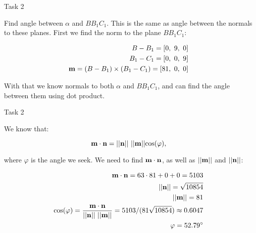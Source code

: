 \documentclass{beamer}
\begin{document}
\begin{frame}{Task 2}
	\begin{flushleft}
		
		Find angle between $\alpha$ and $B B_1 C_1$. This is the same as angle between the normals to these planes. First we find the norm to the plane $B B_1 C_1$:
		
		
\begin{align}
	B - B_1 = [0, \ 9,  \ 0] \\
	B_1 - C_1 = [0, \ 0,  \ 9]  \\
	\mathbf{m} = (B - B_1) \times (B_1 - C_1) = [81, \ 0,  \ 0]
\end{align}		
		
		With that we know normals to both $\alpha$ and $B B_1 C_1$, and can find the angle between them using dot product.
		
	\end{flushleft}
\end{frame}


\begin{frame}{Task 2}
	\begin{flushleft}
		
		We know that:
		
		\begin{equation}
			\mathbf{m} \cdot \mathbf{n} = || \mathbf{n}|| \ || \mathbf{m}|| \text{cos}(\varphi),
		\end{equation}
	
	where $\varphi$ is the angle we seek. We need to find $\mathbf{m} \cdot \mathbf{n}$, as well as $|| \mathbf{m}||$ and $|| \mathbf{n}||$:
		
		\begin{align}
			\mathbf{m} \cdot \mathbf{n} = 63 \cdot 81 + 0 + 0 = 5103 \\
			|| \mathbf{n}|| = \sqrt{10854} \\
			|| \mathbf{m}|| = 81 \\
			\text{cos}(\varphi) = \frac{\mathbf{m} \cdot \mathbf{n} }{|| \mathbf{n}|| \ || \mathbf{m}||} = 5103 / (81 \sqrt{10854}) \approx 0.6047 \\
			\varphi = 52.79^{\circ}
		\end{align}		
		
	\end{flushleft}
\end{frame}
\end{document}
